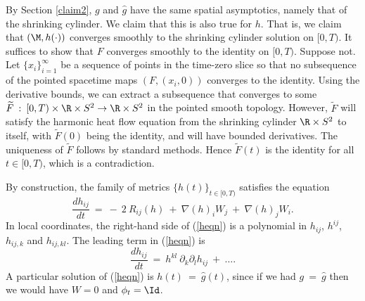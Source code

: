 By Section \ref{claim2}, $g$ and $\widehat{g}$ have the
same spatial asymptotics, namely that of the shrinking cylinder.
We claim that this is also true for $h$. That is, we claim that
$(\M, h(\cdot))$ converges
smoothly to the shrinking cylinder solution on $[0, T)$.
It suffices to show that $F$ converges smoothly to the identity
on $[0, T)$.
Suppose not.  Let $\{x_i\}_{i=1}^\infty$ be a sequence of
points in
the time-zero slice so that no subsequence of
the pointed spacetime maps $(F, (x_i, 0))$ converges to the identity.
Using the derivative
bounds, we can extract a subsequence that converges
to some $\widetilde{F} \: : \: [0, T) \times \R \times S^2 \rightarrow
\R \times S^2$ in the pointed smooth topology.
However, $\widetilde{F}$ will satisfy the harmonic heat flow
equation from the shrinking cylinder $\R \times S^2$ to itself, with
$\widetilde{F}(0)$ being the identity, and will have bounded derivatives.
The uniqueness of $\widetilde{F}$ follows by standard methods.
Hence $\widetilde{F}(t)$ is the identity for all $t \in [0, T)$,
which is a contradiction.

By construction, the family of metrics $\{h(t)\}_{t \in [0, T)}$ satisfies
the equation
\begin{equation} \label{heqn}
\frac{dh_{ij}}{dt} \: = \: - \: 2 \: R_{ij}(h) \: + \:
\nabla(h)_i W_j \: + \: \nabla(h)_j W_i.
\end{equation}
In local coordinates,
the right-hand side of (\ref{heqn}) is a polynomial in
$h_{ij}$, $h^{ij}$, $h_{ij,k}$ and $h_{ij,kl}$. The leading term in
(\ref{heqn}) is
\begin{equation} \label{hder}
\frac{dh_{ij}}{dt} \: = \: h^{kl} \: \partial_k \partial_l h_{ij}
\: + \: \ldots.
\end{equation}
A particular solution of (\ref{heqn}) is $h(t) \: = \:
\widehat{g}(t)$, since if we had $g \: = \: \widehat{g}$ then
we would have $W = 0$ and $\phi_t = \Id$.

